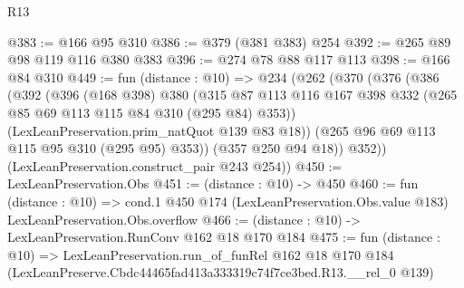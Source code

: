 \begin{lexlean}{R13}
\begin{coremodule}
@383 := @166 @95 @310
@386 := @379 (@381 @383) @254
@392 := @265 @89 @98 @119 @116 @380 @383
@396 := @274 @78 @88 @117 @113
@398 := @166 @84 @310
@449 := fun (distance : @10) =>
  @234
    (@262
      (@370
        (@376
          (@386
            (@392
              (@396
                (@168 @398)
                @380
                (@315
                  @87
                  @113
                  @116
                  @167
                  @398
                  @332
                  (@265 @85 @69 @113 @115 @84 @310 (@295 @84) @353))
                (LexLeanPreservation.prim_natQuot @139 @83 @18))
              (@265 @96 @69 @113 @115 @95 @310 (@295 @95) @353))
            (@357 @250 @94 @18))
          @352))
      (LexLeanPreservation.construct_pair @243 @254))
@450 := LexLeanPreservation.Obs
@451 := (distance : @10) -> @450
@460 := fun (distance : @10) =>
  cond.{1} @450 @174 (LexLeanPreservation.Obs.value @183) LexLeanPreservation.Obs.overflow
@466 := (distance : @10) -> LexLeanPreservation.RunConv @162 @18 @170 @184
@475 := fun (distance : @10) =>
  LexLeanPreservation.run_of_funRel
    @162
    @18
    @170
    @184
    (LexLeanPreserve.Cbdc44465fad413a333319c74f7ce3bed.R13.__rel_0 @139)
\end{coremodule}
\end{lexlean}
